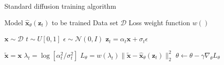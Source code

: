 \noindent
\begin{minipage}[t]{0.48\linewidth}
    \begin{algorithm}[H]
        \centering
        \caption{Standard diffusion training algorithm \cite{v_prediction}}
        \label{alg:ddpm_training_before_distillation}
        \begin{algorithmic}
            \Require Model $\hat{\mathbf{x}}_{\theta}(\mathbf{z}_t)$ to be trained
            \Require Data set $\mathcal{D}$
            \Require Loss weight function $w()$
            
            \State %
            \State %
            \State %
            \State %

                \State $\mathbf{x} \sim \mathcal{D}$ 
                \State $t \sim U[0,1]$ 
                \State $\epsilon \sim \mathcal{N}(0, I)$ 
                \State $\mathbf{z}_t = \alpha_t \mathbf{x} + \sigma_t \epsilon$ 

                \State %
                \State %
                \State %
                \State %
                \State %
                \State %
                \State %
                
                \State $\tilde{\mathbf{x}} = \mathbf{x}$ 
                \State $\lambda_t = \log[\alpha_t^2/\sigma_t^2]$ 
                \State $L_{\theta} = w(\lambda_t) \|\tilde{\mathbf{x}} - \hat{\mathbf{x}}_{\theta}(\mathbf{z}_t)\|_2^2$ 
                \State $\theta \gets \theta - \gamma \nabla_{\theta} L_{\theta}$ 
            \EndWhile

            \State %
            \State %
            \State %
            \State %

        \end{algorithmic}
    \end{algorithm}
\end{minipage}%
\hfill
